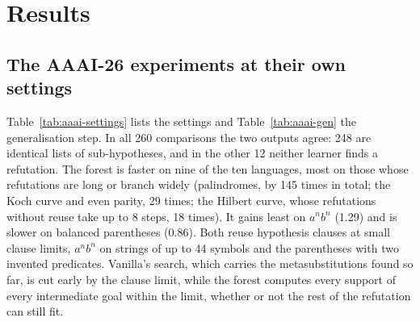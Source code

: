 \documentclass[11pt]{article}
\begin{document}
\section{Results}\label{sec:results}

\subsection{The AAAI-26 experiments at their own settings}

Table~\ref{tab:aaai-settings} lists the settings and Table~\ref{tab:aaai-gen} the
generalisation step. In all 260 comparisons the two outputs agree: 248 are identical
lists of sub-hypotheses, and in the other 12 neither learner finds a refutation. The
forest is faster on nine of the ten languages, most on those whose refutations are
long or branch widely (palindromes, by 145 times in total; the Koch curve and even
parity, 29 times; the Hilbert curve, whose refutations without reuse take up to 8
steps, 18 times). It gains least on $a^nb^n$ (1.29) and is slower on balanced
parentheses (0.86). Both reuse hypothesis clauses at small clause limits, $a^nb^n$ on
strings of up to 44 symbols and the parentheses with two invented predicates.
Vanilla's search, which carries the
metasubstitutions found so far, is cut early by the clause limit, while the forest
computes every support of every intermediate goal within the limit, whether or not
the rest of the refutation can still fit.
\end{document}
